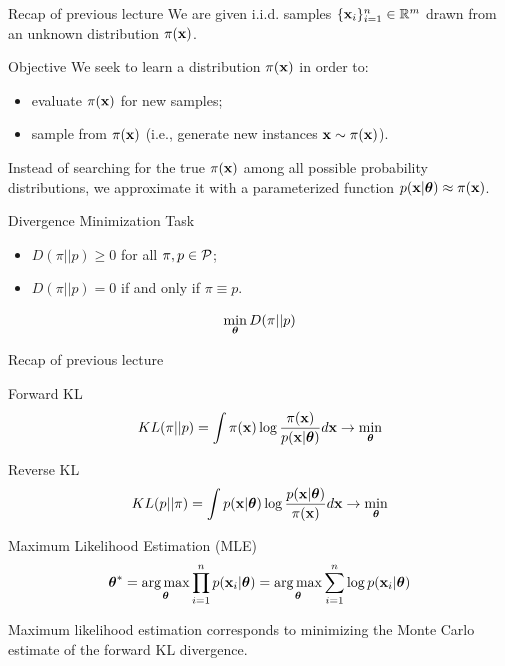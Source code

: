 \documentclass{beamer}
\begin{document}
\begin{frame}
\titlepage
\end{frame}
\begin{frame}{Recap of previous lecture}
	We are given i.i.d. samples $\{\mathbf{x}_i\}_{i=1}^n \in \mathbb{R}^m$ drawn from an unknown distribution $\pi(\mathbf{x})$.

	\begin{block}{Objective}
		We seek to learn a distribution $\pi(\mathbf{x})$ in order to:
		\begin{itemize}
		    \item evaluate $\pi(\mathbf{x})$ for new samples;
		    \item sample from $\pi(\mathbf{x})$ (i.e., generate new instances $\mathbf{x} \sim \pi(\mathbf{x})$).
		\end{itemize}
	\end{block}
	Instead of searching for the true $\pi(\mathbf{x})$ among all possible probability distributions, we approximate it with a parameterized function $p(\mathbf{x} | \boldsymbol{\theta}) \approx \pi(\mathbf{x})$.

	\begin{block}{Divergence Minimization Task}
		\begin{itemize}
			\item $D(\pi || p) \geq 0$ for all $\pi, p \in \mathcal{P}$;
			\item $D(\pi || p) = 0$ if and only if $\pi \equiv p$.
		\end{itemize}
		\[
		\min_{\boldsymbol{\theta}} D(\pi || p)
		\]
	\end{block}
\end{frame}
\begin{frame}{Recap of previous lecture}
	\begin{block}{Forward KL}
		\vspace{-0.2cm}
		\[
		KL(\pi || p) = \int \pi (\mathbf{x}) \log \frac{\pi(\mathbf{x})}{p(\mathbf{x} | \boldsymbol{\theta})} d \mathbf{x} \rightarrow \min_{\boldsymbol{\theta}}
		\]
	\end{block}
	\begin{block}{Reverse KL}
		\vspace{-0.2cm}
		\[
		KL(p || \pi) = \int p (\mathbf{x}| \boldsymbol{\theta}) \log \frac{p(\mathbf{x}| \boldsymbol{\theta})}{\pi(\mathbf{x})} d \mathbf{x} \rightarrow \min_{\boldsymbol{\theta}}
		\]
	\end{block}
	
	\begin{block}{Maximum Likelihood Estimation (MLE)}
		\vspace{-0.3cm}
		\[
		\boldsymbol{\theta}^* = \operatorname*{arg\,max}_{\boldsymbol{\theta}} \prod_{i=1}^n p(\mathbf{x}_i | \boldsymbol{\theta}) = \operatorname*{arg\,max}_{\boldsymbol{\theta}} \sum_{i=1}^n \log p(\mathbf{x}_i | \boldsymbol{\theta})
		\]
		\vspace{-0.1cm}
	\end{block}
	Maximum likelihood estimation corresponds to minimizing the Monte Carlo estimate of the forward KL divergence.
\end{frame}
\end{document}
